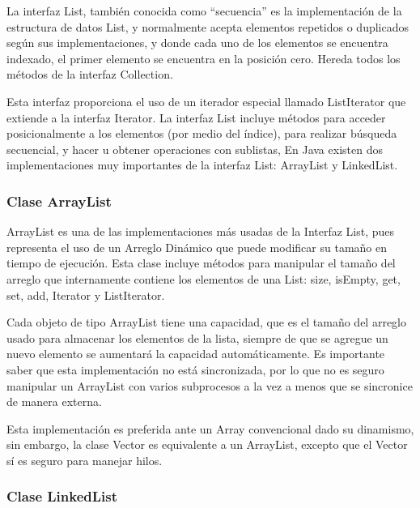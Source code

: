 \documentclass[11pt]{article}
\begin{document}
La interfaz List, también conocida como “secuencia” es la 
implementación de la estructura de datos List, y normalmente acepta 
elementos repetidos o duplicados según sus implementaciones, y donde 
cada uno de los elementos se encuentra indexado, el primer elemento 
se encuentra en la posición cero. Hereda todos los métodos de la 
interfaz Collection.

\par

Esta interfaz proporciona el uso de un iterador especial llamado 
ListIterator que extiende a la interfaz Iterator. La interfaz List 
incluye métodos para acceder posicionalmente a los elementos (por 
medio del índice), para realizar búsqueda secuencial, y hacer u 
obtener operaciones con sublistas, En Java existen dos 
implementaciones muy importantes de la interfaz List: ArrayList y 
LinkedList. 

\subsubsection{Clase ArrayList}
\par

ArrayList es una de las implementaciones más usadas de la Interfaz 
List, pues representa el uso de un Arreglo Dinámico que puede 
modificar su tamaño en tiempo de ejecución. Esta clase incluye 
métodos para manipular el tamaño del arreglo que internamente 
contiene los elementos de una List: size, isEmpty, get, set, add, 
Iterator y ListIterator.

\par

Cada objeto de tipo ArrayList tiene una capacidad, que es el tamaño 
del arreglo usado para almacenar los elementos de la lista, siempre 
de que se agregue un nuevo elemento se aumentará la capacidad 
automáticamente. Es importante saber que esta implementación no está 
sincronizada, por lo que no es seguro manipular un ArrayList con 
varios subprocesos a la vez a menos que se sincronice de manera 
externa. 
\par

Esta implementación es preferida ante un Array convencional dado su 
dinamismo, sin embargo, la clase Vector es equivalente a un 
ArrayList, excepto que el Vector sí es seguro para manejar hilos.

\subsubsection{Clase LinkedList}
\par
\end{document}
